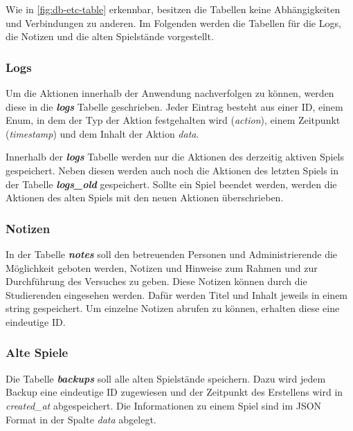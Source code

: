 Wie in \autoref{fig:db-etc-table} erkennbar, besitzen die Tabellen keine Abhängigkeiten und Verbindungen zu anderen. Im Folgenden werden die Tabellen für die Logs, die Notizen und die alten Spielstände vorgestellt.

\subsubsection{Logs}
Um die Aktionen innerhalb der Anwendung nachverfolgen zu können, werden diese in die \textbf{\textit{logs}} Tabelle geschrieben. Jeder Eintrag besteht aus einer ID, einem Enum, in dem der Typ der Aktion festgehalten wird (\textit{action}), einem Zeitpunkt (\textit{timestamp}) und dem Inhalt der Aktion \textit{data}. 

Innerhalb der \textbf{\textit{logs}} Tabelle werden nur die Aktionen des derzeitig aktiven Spiels gespeichert. Neben diesen werden auch noch die Aktionen des letzten Spiels in der Tabelle \textbf{\textit{logs\_old}} gespeichert. Sollte ein Spiel beendet werden, werden die Aktionen des alten Spiels mit den neuen Aktionen überschrieben.

\subsubsection{Notizen}
In der Tabelle \textbf{\textit{notes}} soll den betreuenden Personen und Administrierende die Möglichkeit geboten werden, Notizen und Hinweise zum Rahmen und zur Durchführung des Versuches zu geben. Diese Notizen können durch die Studierenden eingesehen werden. Dafür werden Titel und Inhalt jeweils in einem string gespeichert. Um einzelne Notizen abrufen zu können, erhalten diese eine eindeutige ID.

\subsubsection{Alte Spiele}
Die Tabelle \textbf{\textit{backups}} soll alle alten Spielstände speichern. Dazu wird jedem Backup eine eindeutige ID zugewiesen und der Zeitpunkt des Erstellens wird in \textit{created\_at} abgespeichert. Die Informationen zu einem Spiel sind im JSON Format in der Spalte \textit{data} abgelegt.